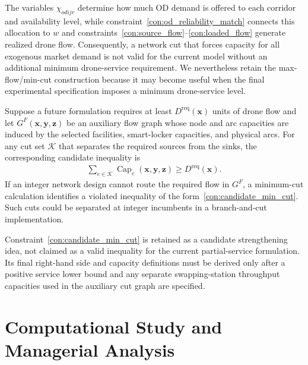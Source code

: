 \documentclass[final,3p,authoryear]{elsarticle}
\begin{document}
\color{black}

\begingroup






The variables $\chi_{odijr}$ determine how much OD demand is offered to each corridor and availability level, while constraint~\eqref{con:od_reliability_match} connects this allocation to $w$ and constraints~\eqref{con:source_flow}--\eqref{con:loaded_flow} generate realized drone flow.
Consequently, a network cut that forces capacity for all exogenous market demand is not valid for the current model without an additional minimum drone-service requirement.
We nevertheless retain the max-flow/min-cut construction because it may become useful when the final experimental specification imposes a minimum drone-service level.

Suppose a future formulation requires at least $D^{\mathrm{req}}(\boldsymbol x)$ units of drone flow and let $G^F(\boldsymbol x,\boldsymbol y,\boldsymbol z)$ be an auxiliary flow graph whose node and arc capacities are induced by the selected facilities, smart-locker capacities, and physical arcs.
For any cut set $\mathcal K$ that separates the required sources from the sinks, the corresponding candidate inequality is
\begin{align}
\sum_{e\in\mathcal K}
\operatorname{Cap}_{e}(\boldsymbol x,\boldsymbol y,\boldsymbol z)
\ge
D^{\mathrm{req}}(\boldsymbol x).
\label{con:candidate_min_cut}
\end{align}
If an integer network design cannot route the required flow in $G^F$, a minimum-cut calculation identifies a violated inequality of the form~\eqref{con:candidate_min_cut}.
Such cuts could be separated at integer incumbents in a branch-and-cut implementation.

Constraint~\eqref{con:candidate_min_cut} is retained as a candidate strengthening idea, not claimed as a valid inequality for the current partial-service formulation.
Its final right-hand side and capacity definitions must be derived only after a positive service lower bound and any separate swapping-station throughput capacities used in the auxiliary cut graph are specified.


\section{Computational Study and Managerial Analysis}
\label{sec:experiments}
\end{document}

